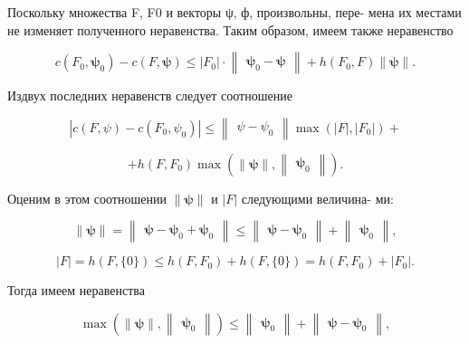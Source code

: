 \documentclass[8pt]{extarticle}
\begin{document}
Поскольку множества F, F0 и векторы ψ, ф, произвольны, пере- мена их местами не изменяет полученного неравенства. Таким образом, имеем также неравенство

\[
c\left( {{F}_{0},{\mathbf{\psi }}_{0}}\right)  - c\left( {F,\mathbf{\psi }}\right)  \leq  \left| {F}_{0}\right|  \cdot  \left\lVert \begin{array}{c} {{\mathbf{\psi }}_{0} - \mathbf{\psi }} \end{array} \right\rVert + h\left( {{F}_{0},F}\right) \parallel \mathbf{\psi }\parallel .
\]

Издвух последних неравенств следует соотношение

\[
\left| {c\left( {F,\psi }\right)  - c\left( {{F}_{0},{\psi }_{0}}\right) }\right|  \leq  \left\lVert \begin{array}{c} {\psi  - {\psi }_{0}} \end{array} \right\rVert\max \left( {\left| F\right| ,\left| {F}_{0}\right| }\right)  +
\]

\[
+ h\left( {F,{F}_{0}}\right) \max \left( {\parallel \mathbf{\psi }\parallel ,\left\lVert \begin{array}{c} {\mathbf{\psi }}_{0} \end{array} \right\rVert}\right) .
\]

Оценим в этом соотношении \(\parallel \mathbf{\psi }\parallel\) и \(\left| F\right|\) следующими величина- ми:

\[
\parallel \mathbf{\psi }\parallel  = \left\lVert \begin{array}{c} {\mathbf{\psi } - {\mathbf{\psi }}_{0} + {\mathbf{\psi }}_{0}} \end{array} \right\rVert \leq  \left\lVert \begin{array}{c} {\mathbf{\psi } - {\mathbf{\psi }}_{0}} \end{array} \right\rVert + \left\lVert \begin{array}{c} {\mathbf{\psi }}_{0} \end{array} \right\rVert,
\]

\[
\left| F\right|  = h\left( {F,\{ 0\} }\right)  \leq  h\left( {F,{F}_{0}}\right)  + h\left( {F,\{ 0\} }\right)  = h\left( {F,{F}_{0}}\right)  + \left| {F}_{0}\right| .
\]

Тогда имеем неравенства

\[
\max \left( {\parallel \mathbf{\psi }\parallel ,\left\lVert \begin{array}{c} {\mathbf{\psi }}_{0} \end{array} \right\rVert}\right)  \leq  \left\lVert \begin{array}{c} {\mathbf{\psi }}_{0} \end{array} \right\rVert + \left\lVert \begin{array}{c} {\mathbf{\psi } - {\mathbf{\psi }}_{0}} \end{array} \right\rVert,
\]
\end{document}
